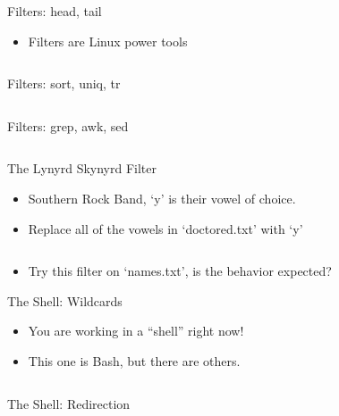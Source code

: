 \documentclass[hyperref={pdfpagelabels=false},12pt]{beamer}
\begin{document}
\begin{frame}{Filters: head, tail}
\begin{itemize}
    \item Filters are Linux power tools
\end{itemize}
\inputminted[bgcolor=lightgray,linenos,fontsize=\footnotesize]{bash}{code/simple-filters-1.txt}
\end{frame}

\begin{frame}{Filters: sort, uniq, tr}
\inputminted[bgcolor=lightgray,linenos,fontsize=\footnotesize]{bash}{code/simple-filters-2.txt}
\end{frame}

\begin{frame}{Filters: grep, awk, sed}
\inputminted[bgcolor=lightgray,linenos,fontsize=\footnotesize]{bash}{code/simple-filters-3.txt}
\end{frame}

\begin{frame}{The Lynyrd Skynyrd Filter}
\begin{itemize}
    \item Southern Rock Band, `y' is their vowel of choice.
    \item Replace all of the vowels in `doctored.txt' with `y'
\end{itemize}
\inputminted[bgcolor=lightgray,linenos,fontsize=\footnotesize]{bash}{code/simple-filters-4.txt}
\begin{itemize}
    \item Try this filter on `names.txt', is the behavior expected?
\end{itemize}
\end{frame}

\begin{frame}{The Shell: Wildcards}
\begin{itemize}
    \item You are working in a ``shell'' right now!
    \item This one is Bash, but there are others.
\end{itemize}
\inputminted[bgcolor=lightgray,linenos,fontsize=\footnotesize]{bash}{code/shell-1.txt}
\end{frame}

\begin{frame}{The Shell: Redirection}
\inputminted[bgcolor=lightgray,linenos,fontsize=\footnotesize]{bash}{code/shell-2.txt}
\end{frame}
\end{document}
